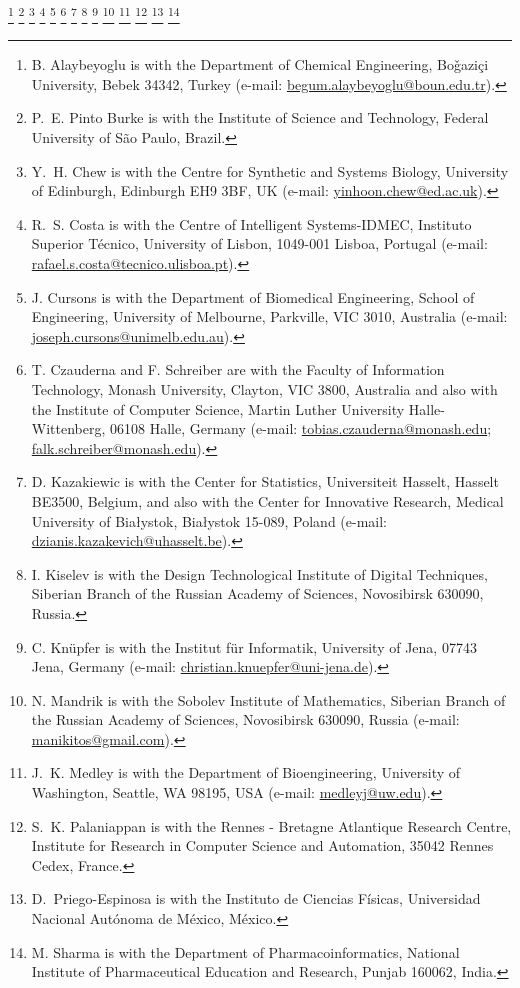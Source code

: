 \documentclass[journal,transmag]{IEEEtran}
\newcommand{\email}[1]{\href{mailto:#1}{#1}}
\begin{document}
{    \thanks{B. Alaybeyoglu is with the Department of Chemical Engineering, Bo\v{g}azi\c{c}i University, Bebek 34342, Turkey (e-mail: \email{begum.alaybeyoglu@boun.edu.tr}).}
    \thanks{P.~E. Pinto Burke is with the Institute of Science and Technology, Federal University of S\~{a}o Paulo, Brazil.}
    \thanks{Y.~H. Chew is with the Centre for Synthetic and Systems Biology, University of Edinburgh, Edinburgh EH9 3BF, UK (e-mail: \email{yinhoon.chew@ed.ac.uk}).}
    \thanks{R.~S. Costa is with the Centre of Intelligent Systems-IDMEC, Instituto Superior T{\'e}cnico, University of Lisbon, 1049-001 Lisboa, Portugal (e-mail: \email{rafael.s.costa@tecnico.ulisboa.pt}).}
    \thanks{J. Cursons is with the Department of Biomedical Engineering, School of Engineering, University of Melbourne, Parkville, VIC 3010, Australia (e-mail: \email{joseph.cursons@unimelb.edu.au}).}
    \thanks{T. Czauderna and F. Schreiber are with the Faculty of Information Technology, Monash University, Clayton, VIC 3800, Australia and also with the Institute of Computer Science, Martin Luther University Halle-Wittenberg, 06108 Halle, Germany (e-mail: \email{tobias.czauderna@monash.edu}; \email{falk.schreiber@monash.edu}).}
    \thanks{D. Kazakiewic is with the Center for Statistics, Universiteit Hasselt, Hasselt BE3500, Belgium, and also with the Center for Innovative Research, Medical University of Bia\l{}ystok, Bia\l{}ystok 15-089, Poland (e-mail: \email{dzianis.kazakevich@uhasselt.be}).}
    \thanks{I. Kiselev is with the Design Technological Institute of Digital Techniques, Siberian Branch of the Russian Academy of Sciences, Novosibirsk 630090, Russia.}
    \thanks{C. Kn\"{u}pfer is with the Institut f\"ur Informatik, University of Jena, 07743 Jena, Germany (e-mail: \email{christian.knuepfer@uni-jena.de}).}
    \thanks{N. Mandrik is with the Sobolev Institute of Mathematics, Siberian Branch of the Russian Academy of Sciences, Novosibirsk 630090, Russia (e-mail: \email{manikitos@gmail.com}).}
    \thanks{J.~K. Medley is with the Department of Bioengineering, University of Washington, Seattle, WA 98195, USA (e-mail: \email{medleyj@uw.edu}).}
    \thanks{S.~K. Palaniappan is with the Rennes - Bretagne Atlantique Research Centre, Institute for Research in Computer Science and Automation, 35042 Rennes Cedex, France.}
    \thanks{D.~Priego-Espinosa is with the Instituto de Ciencias F{\'i}sicas, Universidad Nacional Aut{\'o}noma de M{\'e}xico, M{\'e}xico.}
    \thanks{M. Sharma is with the Department of Pharmacoinformatics, National Institute of Pharmaceutical Education and Research, Punjab 160062, India.}
}
\end{document}
